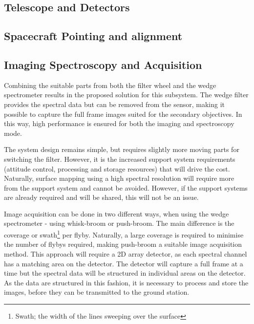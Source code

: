 \subsection{Telescope and Detectors}
\subsection{Spacecraft Pointing and alignment}
\subsection{Imaging Spectroscopy and Acquisition}
Combining the suitable parts from both the filter wheel and the wedge spectrometer results in the proposed solution for this subsystem. The wedge filter provides the spectral data but can be removed from the sensor, making it possible to capture the full frame images suited for the secondary objectives. In this way, high performance is ensured for both the imaging and spectroscopy mode. 

The system design remains simple, but requires slightly more moving parts for switching the filter. However, it is the increased support system requirements (attitude control, processing and storage resources) that will drive the cost. Naturally, surface mapping using a high spectral resolution will require more from the support system and cannot be avoided. However, if the support systems are already required and will be shared, this will not be an issue.

Image acquisition can be done in two different ways, when using the wedge spectrometer - using whisk-broom or push-broom. The main difference is the coverage or swath\footnote{Swath; the width of the lines sweeping over the surface} per flyby. Naturally, a large coverage is required to minimise the number of flybys required, making push-broom a suitable image acquisition method. This approach will require a 2D array detector, as each spectral channel has a matching area on the detector. The detector will capture a full frame at a time but the spectral data will be structured in individual areas on the detector. As the data are structured in this fashion, it is necessary to process and store the images, before they can be transmitted to the ground station.
